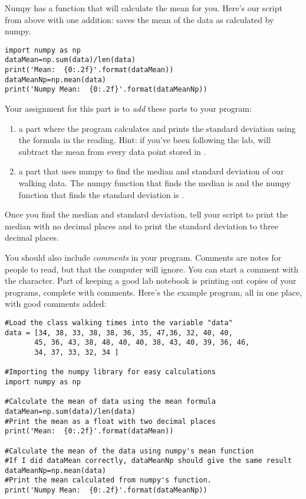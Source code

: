 \documentclass[twoside,11pt,ShortChapTitles]{BYUTextbook}
\begin{document}
Numpy has a function that will calculate the mean for you.  Here's our script from above with one addition:  saves the mean of the data as calculated by numpy.
\begin{Verbatim}
import numpy as np
dataMean=np.sum(data)/len(data)
print('Mean:  {0:.2f}'.format(dataMean))
dataMeanNp=np.mean(data)
print('Numpy Mean:  {0:.2f}'.format(dataMeanNp))

\end{Verbatim}


Your assignment for this part is to {\em add} these parts to your program:
\begin{enumerate}
\item a part where the program calculates and prints the standard deviation using the formula in the reading. Hint: if you've been following the lab,  will subtract the mean from every data point stored in .
\item a part that uses numpy to find the median and standard deviation of our walking data.  The numpy function that finds the median is  and the numpy function that finds the standard deviation is .
\end{enumerate}
Once you find the median and standard deviation, tell your script to print the median with no decimal places and to print the standard deviation to three decimal places.

You should also include {\em comments} in your program.  Comments are notes for people to read, but that the computer will ignore.  You can start a comment with the \code{#} character.  Part of keeping a good lab notebook is printing out copies of your programs, complete with comments. Here's the example program, all in one place, with good comments added:
\begin{Verbatim}
#Load the class walking times into the variable "data"
data = [34, 38, 33, 38, 38, 36, 35, 47,36, 32, 40, 40,
       45, 36, 43, 38, 48, 40, 40, 38, 43, 40, 39, 36, 46,
       34, 37, 33, 32, 34 ]

#Importing the numpy library for easy calculations
import numpy as np

#Calculate the mean of data using the mean formula
dataMean=np.sum(data)/len(data)
#Print the mean as a float with two decimal places
print('Mean:  {0:.2f}'.format(dataMean))

#Calculate the mean of the data using numpy's mean function
#If I did dataMean correctly, dataMeanNp should give the same result
dataMeanNp=np.mean(data)
#Print the mean calculated from numpy's function.
print('Numpy Mean:  {0:.2f}'.format(dataMeanNp))

\end{Verbatim}
\end{document}
